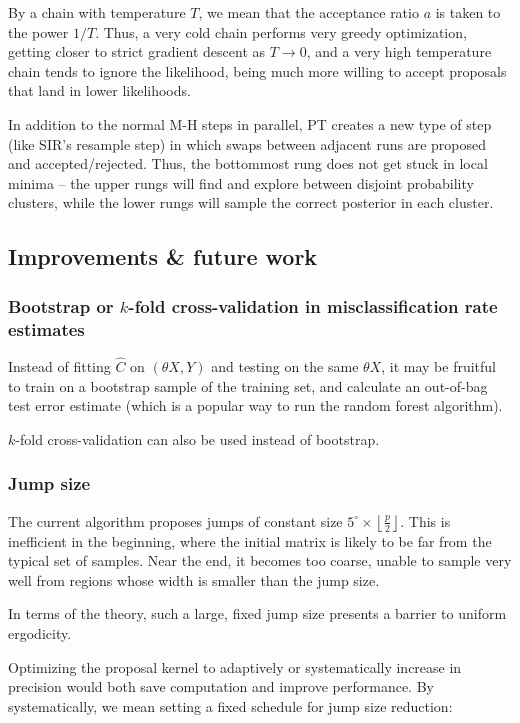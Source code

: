 \documentclass[ejs,preprint]{imsart}
\begin{document}
By a chain with temperature $T$, we mean that the acceptance ratio $a$ is taken to the power $1/T$. Thus, a very cold chain performs very greedy optimization, getting closer to strict gradient descent as $T\to 0$, and a very high temperature chain tends to ignore the likelihood, being much more willing to accept proposals that land in lower likelihoods.

In addition to the normal M-H steps in parallel, PT creates a new type of step (like SIR's resample step) in which swaps between adjacent runs are proposed and accepted/rejected. Thus, the bottommost rung does not get stuck in local minima -- the upper rungs will find and explore between disjoint probability clusters, while the lower rungs will sample the correct posterior in each cluster.

\subsection{Improvements \& future work}

\subsubsection{Bootstrap or $k$-fold cross-validation in misclassification rate estimates}

Instead of fitting $\hat C$ on $(\theta X, Y)$ and testing on the same $\theta X$, it may be fruitful to train on a bootstrap sample of the training set, and calculate an out-of-bag test error estimate (which is a popular way to run the random forest algorithm).

$k$-fold cross-validation can also be used instead of bootstrap.

\subsubsection{Jump size}

The current algorithm proposes jumps of constant size $5^\circ\times\left\lfloor\frac{p}{2}\right\rfloor$. This is inefficient in the beginning, where the initial matrix is likely to be far from the typical set of samples. Near the end, it becomes too coarse, unable to sample very well from regions whose width is smaller than the jump size.

In terms of the theory, such a large, fixed jump size presents a barrier to uniform ergodicity.

Optimizing the proposal kernel to adaptively or systematically increase in precision would both save computation and improve performance. By systematically, we mean setting a fixed schedule for jump size reduction:
\end{document}
